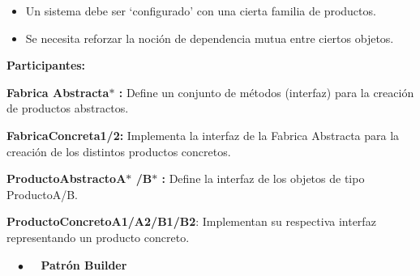 \documentclass[12pt]{article}
\begin{document}
\begin{multicols}{2}
\begin{enumerate}
\begin{itemize}
\begin{itemize}
	\item {\fontsize{9pt}{10.8pt}\selectfont Un sistema debe ser ‘configurado’ con una cierta familia de productos. \par}\par

	\item {\fontsize{9pt}{10.8pt}\selectfont Se necesita reforzar la noción de dependencia mutua entre ciertos objetos. \par}
\end{itemize}\par


\vspace{\baselineskip}

\vspace{\baselineskip}

\vspace{\baselineskip}

\vspace{\baselineskip}
{\fontsize{9pt}{10.8pt}\selectfont \textbf{Participantes: }\par}\par


\vspace{\baselineskip}
{\fontsize{9pt}{10.8pt}\selectfont \textbf{Fabrica Abstracta$\ast$ :} Define un conjunto de métodos (interfaz) para la creación de productos abstractos. \par}\par


\vspace{\baselineskip}
{\fontsize{9pt}{10.8pt}\selectfont \textbf{FabricaConcreta1/2:} Implementa la interfaz de la Fabrica Abstracta para la creación de los distintos productos concretos. \par}\par


\vspace{\baselineskip}
{\fontsize{9pt}{10.8pt}\selectfont \textbf{ProductoAbstractoA$\ast$ /B$\ast$ :} Define la interfaz de los objetos de tipo ProductoA/B. \par}\par


\vspace{\baselineskip}
{\fontsize{9pt}{10.8pt}\selectfont \textbf{ProductoConcretoA1/A2/B1/B2}: Implementan su respectiva interfaz representando un producto concreto.\par}\par


\vspace{\baselineskip}
{\fontsize{9pt}{10.8pt}\selectfont   \textbf{$\bullet$ \ \  Patrón Builder}\par}\par


\end{itemize}
\end{enumerate}
\end{multicols}
\end{document}
